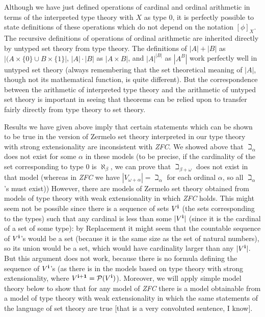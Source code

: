 \documentclass[12pt]{book}
\begin{document}
Although we have just defined operations of cardinal and ordinal
arithmetic in terms of the interpreted type theory with $X$ as type 0,
it is perfectly possible to state definitions of these operations
which do not depend on the notation $[\phi]_X$.  The recursive
definitions of operations of ordinal arithmetic are inherited directly
by untyped set theory from type theory.  The definitions of $|A|+|B|$
as $|(A \times \{0\} \cup B \times \{1\}|$, $|A|\cdot|B|$ as $|A
\times B|$, and $|A|^{|B|}$ as $|A^B|$ work perfectly well in untyped
set theory (always remembering that the set theoretical meaning of
$|A|$, though not its mathematical function, is quite different).  But
the correspondence between the arithmetic of interpreted type theory
and the arithmetic of untyped set theory is important in seeing that
theorems can be relied upon to transfer fairly directly from type
theory to set theory.

Results we have given above imply that certain statements which can be
shown to be true in the version of Zermelo set theory interpreted in
our type theory with strong extensionality are inconsistent with {\em
ZFC\/}.  We showed above that $\beth_{\alpha}$ does not exist for some
$\alpha$ in these models (to be precise, if the cardinality of the set
corresponding to type 0 is $\aleph_{\beta}$, we can prove that
$\beth_{\beta+\omega}$ does not exist in that model (whereas in {\em
ZFC\/} we have $|V_{\omega+\alpha}| = \beth_{\alpha}$ for each ordinal
$\alpha$, so all $\beth_{\alpha}$'s must exist)) However, there are
models of Zermelo set theory obtained from models of type theory with
weak extensionality in which {\em ZFC\/} holds.  This might seem not
be possible since there is a sequence of sets $V^{\bf i}$ (the sets
corresponding to the types) such that any cardinal is less than some
$|V^{\bf i}|$ (since it is the cardinal of a set of some type): by
Replacement it might seem that the countable sequence of $V^{\bf i}$'s
would be a set (because it is the same size as the set of natural
numbers), so its union would be a set, which would have cardinality
larger than any $|V^{\bf i}|$.  But this argument does not work,
because there is no formula defining the sequence of $V^{\bf i}$'s (as
there is in the models based on type theory with strong
extensionality, where $V^{\bf i+1} = {\cal P}(V^{\bf i})$).  Moreover,
we will apply simple model theory below to show that for any model of
{\em ZFC\/} there is a model obtainable from a model of type theory
with weak extensionality in which the same statements of the language
of set theory are true [that is a very convoluted sentence, I know].
\end{document}
